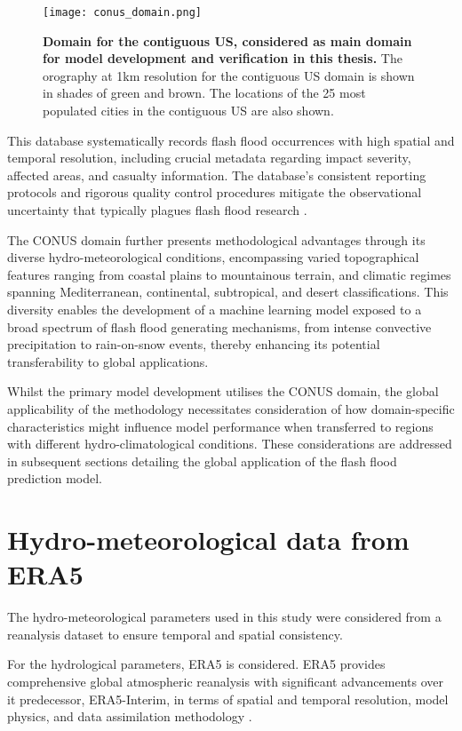 \begin{figure}[htbp]
\centering
\texttt{[image: conus\_domain.png]}
\caption{\textbf{Domain for the contiguous US, considered as main domain for model development and verification in this thesis.} The orography at 1km resolution for the contiguous US domain is shown in shades of green and brown. The locations of the 25 most populated cities in the contiguous US are also shown.}
\label{fig:conus_domain}
\end{figure}

This database systematically records flash flood occurrences with high spatial and temporal resolution, including crucial metadata regarding impact severity, affected areas, and casualty information. The database's consistent reporting protocols and rigorous quality control procedures mitigate the observational uncertainty that typically plagues flash flood research \citep{Panwar_2020}.

The CONUS domain further presents methodological advantages through its diverse hydro-meteorological conditions, encompassing varied topographical features ranging from coastal plains to mountainous terrain, and climatic regimes spanning Mediterranean, continental, subtropical, and desert classifications. This diversity enables the development of a machine learning model exposed to a broad spectrum of flash flood generating mechanisms, from intense convective precipitation to rain-on-snow events, thereby enhancing its potential transferability to global applications.

Whilst the primary model development utilises the CONUS domain, the global applicability of the methodology necessitates consideration of how domain-specific characteristics might influence model performance when transferred to regions with different hydro-climatological conditions. These considerations are addressed in subsequent sections detailing the global application of the flash flood prediction model.


\section{Hydro-meteorological data from ERA5}

The hydro-meteorological parameters used in this study were considered from a reanalysis dataset to ensure temporal and spatial consistency. 

For the hydrological parameters, ERA5 is considered. ERA5 provides comprehensive global atmospheric reanalysis with significant advancements over it predecessor, ERA5-Interim, in terms of spatial and temporal resolution, model physics, and data assimilation methodology \citep{Hersbach_2020}. 


